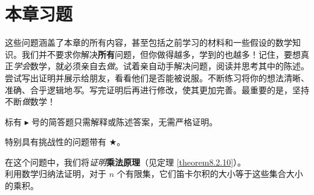 \section{本章习题}

这些问题涵盖了本章的所有内容，甚至包括之前学习的材料和一些假设的数学知识。我们并不要求你解决\textbf{所有}问题，但你做得越多，学到的也越多！记住，要想真正\emph{学会}数学，就必须亲自去\emph{做}。试着亲自动手解决问题，阅读并思考其中的陈述。尝试写出证明并展示给朋友，看看他们是否能被说服。不断练习将你的想法清晰、准确、合乎逻辑地\emph{写}。写完证明后再进行修改，使其更加完善。最重要的是，坚持不断\emph{做}数学！

标有 $\blacktriangleright$ 号的简答题只需解释或陈述答案，无需严格证明。

特别具有挑战性的问题带有 $\bigstar$。\\

\begin{exercise}\label{exc:exercises8.9.1}
    在这个问题中，我们将\emph{证明}\textbf{乘法原理}（见定理 \ref{theorem8.2.10}）。\\
    利用数学归纳法证明，对于 $n$ 个有限集，它们笛卡尔积的大小等于这些集合大小的乘积。
\end{exercise}

